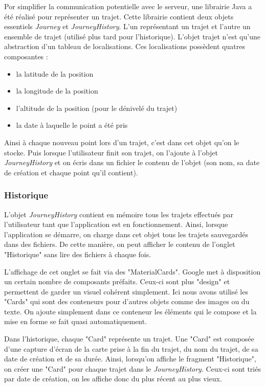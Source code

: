 Por simplifier la communication potentielle avec le serveur, une librairie Java a été réalisé pour représenter un trajet. Cette librairie
contient deux objets essentiels \emph{Journey} et \emph{JourneyHistory}. L'un représentant un trajet et l'autre un ensemble de trajet
(utilisé plus tard pour l'historique). L'objet trajet n'est qu'une abstraction d'un tableau de localisations. Ces localisations possèdent
quatres composantes :
\begin{itemize}
  \item la latitude de la position
  \item la longitude de la position
  \item l'altitude de la position (pour le dénivelé du trajet)
  \item la date à laquelle le point a été pris
\end{itemize}
Ainsi à chaque nouveau point lors d'un trajet, c'est dans cet objet qu'on le stocke. Puis lorsque l'utilisateur finit son trajet,
on l'ajoute à l'objet \emph{JourneyHistory} et on écris dans un fichier le contenu de l'objet (son nom, sa date de création et chaque
point qu'il contient).

\subsubsection{Historique}
L'objet \emph{JourneyHistory} contient en mémoire tous les trajets effectués par l'utilisateur tant que l'application est en fonctionnement.
Ainsi, lorsque l'application se démarre, on charge dans cet objet tous les trajets sauvegardés dans des fichiers. De cette manière, on peut
afficher le contenu de l'onglet "Historique" sans lire des fichiers à chaque fois.

L'affichage de cet onglet se fait via des "MaterialCards". Google met à disposition un certain nombre de composants préfaits. Ceux-ci sont
plus "design" et permettent de garder un visuel cohérent simplement. Ici nous avons utilisé les "Cards" qui sont des conteneurs pour d'autres
objets comme des images ou du texte. On ajoute simplement dans ce conteneur les éléments qui le compose et la mise en forme se fait quasi
automatiquement.

Dans l'historique, chaque "Card" représente un trajet. Une "Card" est composée d'une capture d'écran de la carte prise à la fin du trajet,
du nom du trajet, de sa date de création et de sa durée. Ainsi, lorsqu'on affiche le fragment "Historique", on créer une "Card" pour
chaque trajet dans le \emph{JourneyHistory}. Ceux-ci sont triés par date de création, on les affiche donc du plus récent au plus vieux.

